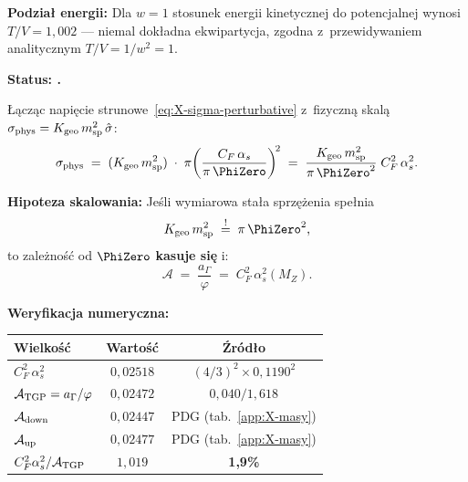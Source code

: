 \begin{proposition}
\medskip\noindent
\textbf{Podzia\l{} energii:}
Dla $w = 1$ stosunek energii kinetycznej do potencjalnej wynosi
$T/V = 1{,}002$ --- niemal dok\l{}adna ekwipartycja, zgodna
z~przewidywaniem analitycznym $T/V = 1/w^2 = 1$.
\end{proposition}

\begin{proposition}[Skasowanie $\PhiZero$
  i~relacja $\mathcal{A} = C_F^2\,\alpha_s^2$ (v47b)]%
\label{prop:X-A-from-tube-tension}
\textbf{Status: .}

\L{}\k{a}cz\k{a}c napi\k{e}cie strunowe~\eqref{eq:X-sigma-perturbative}
z~fizyczn\k{a} skal\k{a} $\sigma_{\rm phys} = K_{\rm geo}\,m_{\rm sp}^2\,
\hat\sigma$:
\begin{equation}\label{eq:X-sigma-physical}
  \sigma_{\rm phys}
  \;=\;
  (K_{\rm geo}\,m_{\rm sp}^2)
  \;\cdot\;
  \pi\!\left(\frac{C_F\,\alpha_s}{\pi\,\PhiZero}\right)^{\!2}
  \;=\;
  \frac{K_{\rm geo}\,m_{\rm sp}^2}{\pi\,\PhiZero^2}
  \;C_F^2\,\alpha_s^2.
\end{equation}

\textbf{Hipoteza skalowania:}
Je\'sli wymiarowa sta\l{}a sprz\k{e}\.zenia spe\l{}nia
\begin{equation}\label{eq:X-K-msp-hypothesis}
  K_{\rm geo}\,m_{\rm sp}^2
  \;\stackrel{!}{=}\;
  \pi\,\PhiZero^2,
\end{equation}
to zale\.zno\'s\'c od $\PhiZero$ \textbf{kasuje si\k{e}} i:
\begin{equation}\label{eq:X-A-equals-CF2-alphas2}
  \boxed{
    \mathcal{A}
    \;=\;
    \frac{a_\Gamma}{\varphi}
    \;=\;
    C_F^2\,\alpha_s^2(M_Z).
  }
\end{equation}

\medskip\noindent
\textbf{Weryfikacja numeryczna:}
\begin{center}\small
\begin{tabular}{@{}lcc@{}}
\toprule
  Wielko\'s\'c & Warto\'s\'c & \'Zr\'od\l{}o \\
\midrule
  $C_F^2\,\alpha_s^2$ & $0{,}02518$ & $(4/3)^2 \times 0{,}1190^2$ \\
  $\mathcal{A}_{\rm TGP} = a_\Gamma/\varphi$ & $0{,}02472$ & $0{,}040/1{,}618$ \\
  $\mathcal{A}_{\rm down}$ & $0{,}02447$ & PDG (tab.~\ref{app:X-masy}) \\
  $\mathcal{A}_{\rm up}$ & $0{,}02477$ & PDG (tab.~\ref{app:X-masy}) \\
\midrule
  $C_F^2\alpha_s^2 / \mathcal{A}_{\rm TGP}$ & $1{,}019$ & \textbf{1{,}9\%} \\
\bottomrule
\end{tabular}
\end{center}


\end{proposition}
